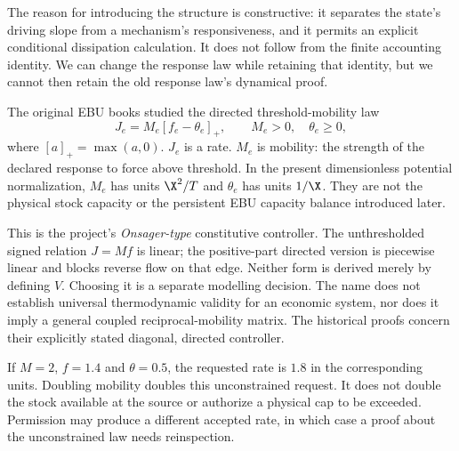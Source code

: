 The reason for introducing the structure is constructive: it separates the
state's driving slope from a mechanism's responsiveness, and it permits an
explicit conditional dissipation calculation. It does not follow from the
finite accounting identity. We can change the response law while retaining
that identity, but we cannot then retain the old response law's dynamical proof.

The original EBU books studied the directed threshold-mobility law
\begin{equation}\label{eq:onsager}
 J_e=M_e[f_e-\theta_e]_+,\qquad M_e>0,\quad\theta_e\geq0,
\end{equation}
where $[a]_+=\max(a,0)$. $J_e$ is a rate. $M_e$ is mobility: the strength
of the declared response to force above threshold. In the present dimensionless
potential normalization, $M_e$ has units $\X^2/T$ and $\theta_e$ has units
$1/\X$. They are not the physical stock capacity or the persistent EBU
capacity balance introduced later.

This is the project's \emph{Onsager-type} constitutive controller. The
unthresholded signed relation $J=Mf$ is linear; the positive-part directed
version is piecewise linear and blocks reverse flow on that edge. Neither
form is derived merely by defining $V$. Choosing it is a separate modelling
decision. The name does not establish universal thermodynamic validity for
an economic system, nor does it imply a general coupled reciprocal-mobility
matrix. The historical proofs concern their explicitly stated diagonal,
directed controller.

If $M=2$, $f=1.4$ and $\theta=0.5$, the requested rate is $1.8$ in the
corresponding units. Doubling mobility doubles this unconstrained request.
It does not double the stock available at the source or authorize a physical
cap to be exceeded. Permission may produce a different accepted rate, in
which case a proof about the unconstrained law needs reinspection.

